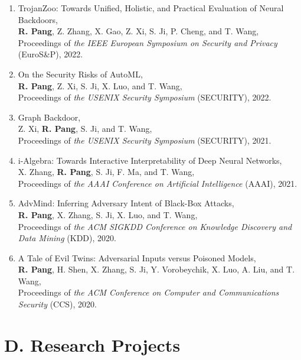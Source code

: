 \documentclass{resume}
\begin{document}
\begin{resume}
\begin{enumerate}[labelsep=15pt, parsep=8pt, resume]

\item TrojanZoo: Towards Unified, Holistic, and Practical Evaluation of Neural Backdoors,\\
\textbf{R. Pang}, Z. Zhang, X. Gao, Z. Xi, S. Ji, P. Cheng, and T. Wang,\\
Proceedings of {\it the IEEE European Symposium on Security and Privacy} (EuroS\&P), 2022.

\item On the Security Risks of AutoML,\\
\textbf{R. Pang}, Z. Xi, S. Ji, X. Luo, and T. Wang,\\
Proceedings of {\it the USENIX Security Symposium} (SECURITY), 2022.

\item Graph Backdoor,\\
Z. Xi, \textbf{R. Pang}, S. Ji, and T. Wang,\\
Proceedings of {\it the USENIX Security Symposium} (SECURITY), 2021.

\item i-Algebra: Towards Interactive Interpretability of Deep Neural Networks,\\
X. Zhang, \textbf{R. Pang}, S. Ji, F. Ma, and T. Wang,\\
Proceedings of {\it the AAAI Conference on Artificial Intelligence} (AAAI), 2021.

\item AdvMind: Inferring Adversary Intent of Black-Box Attacks,\\
\textbf{R. Pang}, X. Zhang, S. Ji, X. Luo, and T. Wang,\\
Proceedings of {\it the ACM SIGKDD Conference on Knowledge Discovery and Data Mining} (KDD), 2020.

\item A Tale of Evil Twins: Adversarial Inputs versus Poisoned Models,\\
\textbf{R. Pang}, H. Shen, X. Zhang, S. Ji, Y. Vorobeychik, X. Luo, A. Liu, and T. Wang,\\
Proceedings of {\it the ACM Conference on Computer and Communications Security} (CCS), 2020.

\end{enumerate}

\vspace{0.2in} 
\section{D. Research Projects}
\vspace{24pt}


\end{resume}
\end{document}
